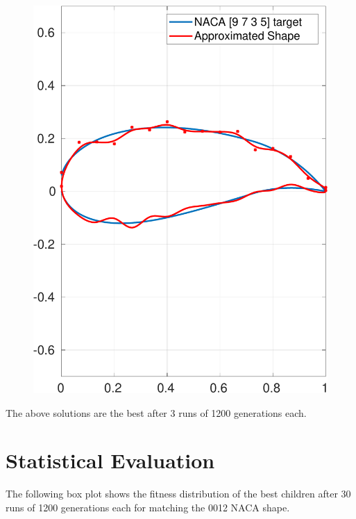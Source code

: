 \documentclass[paper=a4, fontsize=11pt]{scrartcl} %
\begin{document}
\begin{figure}[H]
\begin{minipage}{.5\textwidth}
        \includegraphics[width=.95\linewidth]{a3-shapematch-9735-final}
        \label{fig:solution}
    \end{minipage}
    \end{figure}
    The above solutions are the best after 3 runs of 1200 generations each.

    \section{Statistical Evaluation}

    The following box plot shows the fitness distribution of the best children after 30 runs of 1200 generations each for matching the 0012 NACA shape.
\end{document}
